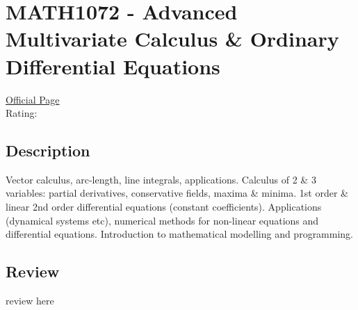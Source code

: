 \hypertarget{MATH1072}{\section{MATH1072 - Advanced Multivariate Calculus \& Ordinary Differential Equations}}

\large
\textcolor{turbo_purple}{\href{https://my.uq.edu.au/programs-courses/course.html?course_code=MATH1072}{Official Page}} \\
Rating: \cstar\cstar\cstar\cstar\ostar

\normalsize
\subsection*{Description}
Vector calculus, arc-length, line integrals, applications.
Calculus of 2 \& 3 variables: partial derivatives, conservative fields, maxima \& minima.
1st order \& linear 2nd order differential equations (constant coefficients).
Applications (dynamical systems etc), numerical methods for non-linear equations and differential equations.
Introduction to mathematical modelling and programming.

\subsection*{Review}
review here
